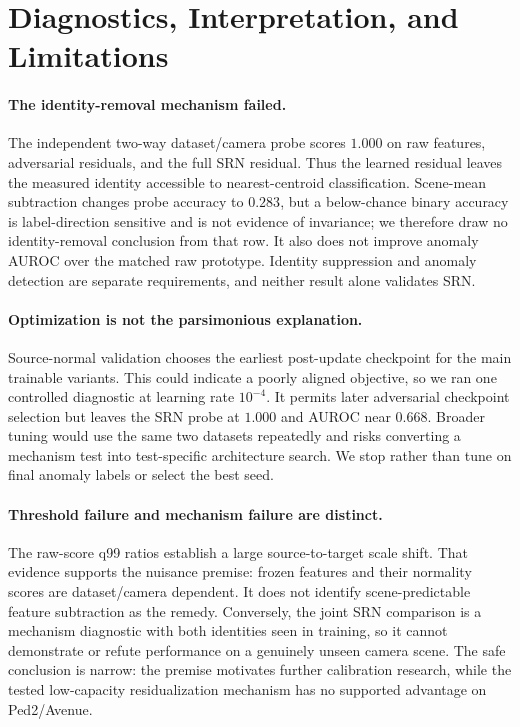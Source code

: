 \section{Diagnostics, Interpretation, and Limitations}
\label{sec:diagnostics}

\paragraph{The identity-removal mechanism failed.}
The independent two-way dataset/camera probe scores $1.000$ on raw features, adversarial residuals, and the full SRN residual. Thus the learned residual leaves the measured identity accessible to nearest-centroid classification. Scene-mean subtraction changes probe accuracy to $0.283$, but a below-chance binary accuracy is label-direction sensitive and is not evidence of invariance; we therefore draw no identity-removal conclusion from that row. It also does not improve anomaly AUROC over the matched raw prototype. Identity suppression and anomaly detection are separate requirements, and neither result alone validates SRN.

\paragraph{Optimization is not the parsimonious explanation.}
Source-normal validation chooses the earliest post-update checkpoint for the main trainable variants. This could indicate a poorly aligned objective, so we ran one controlled diagnostic at learning rate $10^{-4}$. It permits later adversarial checkpoint selection but leaves the SRN probe at $1.000$ and AUROC near $0.668$. Broader tuning would use the same two datasets repeatedly and risks converting a mechanism test into test-specific architecture search. We stop rather than tune on final anomaly labels or select the best seed.

\paragraph{Threshold failure and mechanism failure are distinct.}
The raw-score q99 ratios establish a large source-to-target scale shift. That evidence supports the nuisance premise: frozen features and their normality scores are dataset/camera dependent. It does not identify scene-predictable feature subtraction as the remedy. Conversely, the joint SRN comparison is a mechanism diagnostic with both identities seen in training, so it cannot demonstrate or refute performance on a genuinely unseen camera scene. The safe conclusion is narrow: the premise motivates further calibration research, while the tested low-capacity residualization mechanism has no supported advantage on Ped2/Avenue.

